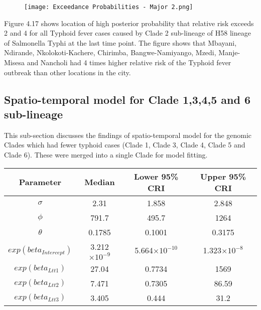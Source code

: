 \documentclass[a4paper]{thesis}
\begin{document}
\begin{figure}[H]
\begin{center}
\texttt{[image: Exceedance Probabilities - Major 2.png]}
\end{center}
\end{figure}

Figure 4.17 shows location of high posterior probability  that relative risk exceeds 2 and 4 for all Typhoid fever cases caused by Clade 2 sub-lineage of H58 lineage of Salmonella Typhi at the last time point. The figure shows that Mbayani, Ndirande, Nkolokoti-Kachere, Chirimba, Bangwe-Namiyango, Mzedi, Manje-Misesa and Nancholi had 4 times higher relative risk of the Typhoid fever outbreak than other locations in the city.

\subsection{Spatio-temporal model for Clade 1,3,4,5 and 6 sub-lineage}

This sub-section discusses the findings of spatio-temporal model for the genomic Clades which had fewer typhoid cases (Clade 1, Clade 3, Clade 4, Clade 5 and Clade 6). These were merged into a single Clade for model fitting.

\begin{table}[h]
    \centering
    \begin{tabular}{cccc}
     \toprule
         Parameter & Median & Lower 95\% CRI & Upper 95\% CRI \\ \midrule
        $\sigma$ & 2.31 & 1.858 & 2.848 \\
        $\phi$ & 791.7 & 495.7 & 1264 \\
        $\theta$ & 0.1785 & 0.1001 & 0.3175 \\
        $exp(beta_{Intercept})$ & 3.212$\times10^{-9}$ & 5.664$\times10^{-10}$ & 1.323$\times10^{-8}$ \\
        $exp(beta_{Ltt1})$ & 27.04 & 0.7734 & 1569 \\
        $exp(beta_{Ltt2})$ & 7.471 & 0.7305 & 86.59 \\
        $exp(beta_{Ltt3})$ & 3.405 & 0.444 & 31.2 \\
         \bottomrule
    \end{tabular}
\end{table}
\end{document}
